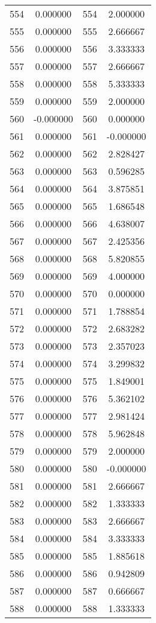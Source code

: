 \documentclass[12pt]{article}
\begin{document}
\begin{longtable}{@{}cccc@{}}
554 & 0.000000 & 554 & 2.000000 \\
555 & 0.000000 & 555 & 2.666667 \\
556 & 0.000000 & 556 & 3.333333 \\
557 & 0.000000 & 557 & 2.666667 \\
558 & 0.000000 & 558 & 5.333333 \\
559 & 0.000000 & 559 & 2.000000 \\
560 & -0.000000 & 560 & 0.000000 \\
561 & 0.000000 & 561 & -0.000000 \\
562 & 0.000000 & 562 & 2.828427 \\
563 & 0.000000 & 563 & 0.596285 \\
564 & 0.000000 & 564 & 3.875851 \\
565 & 0.000000 & 565 & 1.686548 \\
566 & 0.000000 & 566 & 4.638007 \\
567 & 0.000000 & 567 & 2.425356 \\
568 & 0.000000 & 568 & 5.820855 \\
569 & 0.000000 & 569 & 4.000000 \\
570 & 0.000000 & 570 & 0.000000 \\
571 & 0.000000 & 571 & 1.788854 \\
572 & 0.000000 & 572 & 2.683282 \\
573 & 0.000000 & 573 & 2.357023 \\
574 & 0.000000 & 574 & 3.299832 \\
575 & 0.000000 & 575 & 1.849001 \\
576 & 0.000000 & 576 & 5.362102 \\
577 & 0.000000 & 577 & 2.981424 \\
578 & 0.000000 & 578 & 5.962848 \\
579 & 0.000000 & 579 & 2.000000 \\
580 & 0.000000 & 580 & -0.000000 \\
581 & 0.000000 & 581 & 2.666667 \\
582 & 0.000000 & 582 & 1.333333 \\
583 & 0.000000 & 583 & 2.666667 \\
584 & 0.000000 & 584 & 3.333333 \\
585 & 0.000000 & 585 & 1.885618 \\
586 & 0.000000 & 586 & 0.942809 \\
587 & 0.000000 & 587 & 0.666667 \\
588 & 0.000000 & 588 & 1.333333 \\

\end{longtable}
\end{document}
